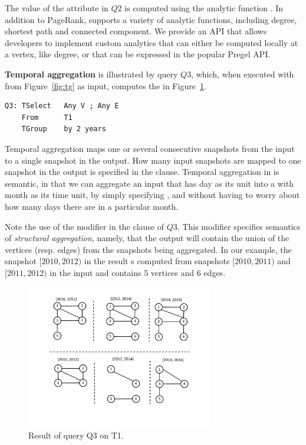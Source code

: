 The value of the attribute  in $Q2$ is computed using the
analytic function .  In addition to PageRank, \ql
supports a variety of analytic functions, including degree, shortest
path and connected component.  We provide an API that allows
developers to implement custom analytics that can either be computed
locally at a vertex, like degree, or that can be expressed in the
popular Pregel API. 

{\bf Temporal aggregation} is illustrated by query $Q3$, which, when
executed with  from Figure~\ref{fig:tg} as input, computes
the \tg in Figure~\ref{fig:tg_any}.

\begin{verbatim}
Q3: TSelect   Any V ; Any E 
    From      T1
    TGroup    by 2 years
\end{verbatim}

Temporal aggregation maps one or several consecutive snapshots from
the input to a single snapshot in the output.  How many input
snapshots are mapped to one snapshot in the output is specified in the
 clause.  Temporal aggregation in \ql is semantic, in
that we can aggregate an input \tg that has day as its unit into a \tg
with month as its time unit, by simply specifying , and without having to worry about how many days there are in
a particular month.

Note the use of the modifier  in the  clause
of $Q3$.  This modifier specifies semantics of {\em structural
  aggregation}, namely, that the output will contain the union of the
vertices (resp. edges) from the snapshots being aggregated.  In our
example, the snapshot $[2010, 2012)$ in the result s computed from
  snapshots $[2010, 2011)$ and $[2011, 2012)$ in the input and
      contains 5 vertices and 6 edges.

\begin{figure}
\includegraphics[width=3.2in]{figs/TGroupAny.pdf}
\caption{Result of query Q3 on T1.}
\label{fig:tg_any}
\end{figure}

